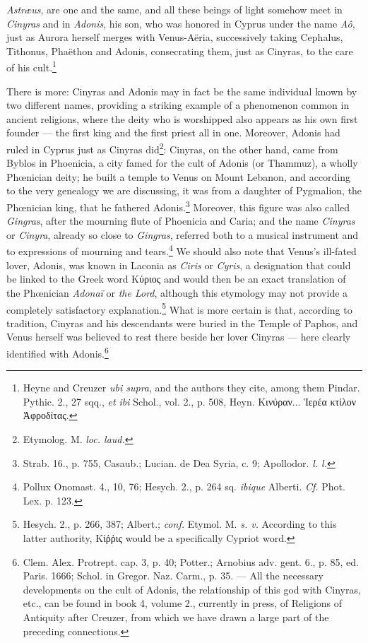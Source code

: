 \documentclass[a4paper, 11pt, oneside, polutonikogreek, english]{article}
\begin{document}
\emph{Astræus}, are one and the same, and all these beings of light somehow meet in \emph{Cinyras} and in \emph{Adonis}, his son, who was honored in Cyprus under the name \emph{Aô}, just as Aurora herself merges with Venus-Aëria, successively taking Cephalus, Tithonus, Phaëthon and Adonis, consecrating them, just as Cinyras, to the care of his cult.\footnote{Heyne and Creuzer \emph{ubi supra}, and the authors they cite, among them Pindar. Pythic. 2., 27 sqq., \emph{et ibi} Schol., vol. 2., p. 508, Heyn. Κινύραν... Ἱερέα κτίλον Ἀφροδίτας.}

There is more: Cinyras and Adonis may in fact be the same individual known by two different names, providing a striking example of a phenomenon common in ancient religions, where the deity who is worshipped also appears as his own first founder --- the first king and the first priest all in one. Moreover, Adonis had ruled in Cyprus just as Cinyras did\footnote{Etymolog. M. \emph{loc. laud.}}: Cinyras, on the other hand, came from Byblos in Phoenicia, a city famed for the cult of Adonis (or Thammuz), a wholly Phœnician deity; he built a temple to Venus on Mount Lebanon, and according to the very genealogy we are discussing, it was from a daughter of Pygmalion, the Phœnician king, that he fathered Adonis.\footnote{Strab. 16., p. 755, Casaub.; Lucian. de Dea Syria, c. 9; Apollodor. \emph{l. l.}} Moreover, this figure was also called \emph{Gingras}, after the mourning flute of Phoenicia and Caria; and the name \emph{Cinyras} or \emph{Cinyra}, already so close to \emph{Gingras}, referred both to a musical instrument and to expressions of mourning and tears.\footnote{Pollux Onomast. 4., 10, 76; Hesych. 2., p. 264 sq. \emph{ibique} Alberti. \emph{Cf.} Phot. Lex. p. 123.} We should also note that Venus's ill-fated lover, Adonis, was known in Laconia as \emph{Ciris} or \emph{Cyris}, a designation that could be linked to the Greek word Κύριος and would then be an exact translation of the Phœnician \emph{Adonaï} or \emph{the Lord}, although this etymology may not provide a completely satisfactory explanation.\footnote{Hesych. 2., p. 266, 387; Albert.; \emph{conf.} Etymol. M. \emph{s. v.} According to this latter authority, Κίῤῥις would be a specifically Cypriot word.} What is more certain is that, according to tradition, Cinyras and his descendants were buried in the Temple of Paphos, and Venus herself was believed to rest there beside her lover Cinyras --- here clearly identified with Adonis.\footnote{Clem. Alex. Protrept. cap. 3, p. 40; Potter.; Arnobius adv. gent. 6., p. 85, ed. Paris. 1666; Schol. in Gregor. Naz. Carm., p. 35. --- All the necessary developments on the cult of Adonis, the relationship of this god with Cinyras, etc., can be found in book 4, volume 2., currently in press, of Religions of Antiquity after Creuzer, from which we have drawn a large part of the preceding connections.}
\end{document}
